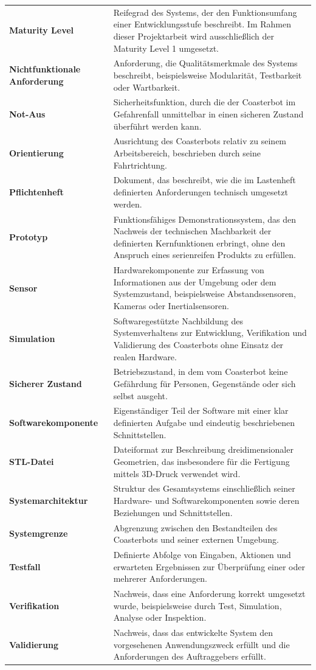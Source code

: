 \documentclass[
  a4paper,
  12pt,
  DIV=12,        %
  parskip=half,  %
  headings=small %
]{scrartcl}
\theoremstyle{definition}
\theoremstyle{definition}
\begin{document}
\begin{longtable}[]{@{}
  >{\raggedright\arraybackslash}p{}
  >{\raggedright\arraybackslash}p{}@{}}
\textbf{Maturity Level} & Reifegrad des Systems, der den Funktionsumfang
einer Entwicklungsstufe beschreibt. Im Rahmen dieser Projektarbeit wird
ausschließlich der Maturity Level 1 umgesetzt. \\
\textbf{Nichtfunktionale Anforderung} & Anforderung, die
Qualitätsmerkmale des Systems beschreibt, beispielsweise Modularität,
Testbarkeit oder Wartbarkeit. \\
\textbf{Not-Aus} & Sicherheitsfunktion, durch die der Coasterbot im
Gefahrenfall unmittelbar in einen sicheren Zustand überführt werden
kann. \\
\textbf{Orientierung} & Ausrichtung des Coasterbots relativ zu seinem
Arbeitsbereich, beschrieben durch seine Fahrtrichtung. \\
\textbf{Pflichtenheft} & Dokument, das beschreibt, wie die im Lastenheft
definierten Anforderungen technisch umgesetzt werden. \\
\textbf{Prototyp} & Funktionsfähiges Demonstrationssystem, das den
Nachweis der technischen Machbarkeit der definierten Kernfunktionen
erbringt, ohne den Anspruch eines serienreifen Produkts zu erfüllen. \\
\textbf{Sensor} & Hardwarekomponente zur Erfassung von Informationen aus
der Umgebung oder dem Systemzustand, beispielsweise Abstandssensoren,
Kameras oder Inertialsensoren. \\
\textbf{Simulation} & Softwaregestützte Nachbildung des Systemverhaltens
zur Entwicklung, Verifikation und Validierung des Coasterbots ohne
Einsatz der realen Hardware. \\
\textbf{Sicherer Zustand} & Betriebszustand, in dem vom Coasterbot keine
Gefährdung für Personen, Gegenstände oder sich selbst ausgeht. \\
\textbf{Softwarekomponente} & Eigenständiger Teil der Software mit einer
klar definierten Aufgabe und eindeutig beschriebenen Schnittstellen. \\
\textbf{STL-Datei} & Dateiformat zur Beschreibung dreidimensionaler
Geometrien, das insbesondere für die Fertigung mittels 3D-Druck
verwendet wird. \\
\textbf{Systemarchitektur} & Struktur des Gesamtsystems einschließlich
seiner Hardware- und Softwarekomponenten sowie deren Beziehungen und
Schnittstellen. \\
\textbf{Systemgrenze} & Abgrenzung zwischen den Bestandteilen des
Coasterbots und seiner externen Umgebung. \\
\textbf{Testfall} & Definierte Abfolge von Eingaben, Aktionen und
erwarteten Ergebnissen zur Überprüfung einer oder mehrerer
Anforderungen. \\
\textbf{Verifikation} & Nachweis, dass eine Anforderung korrekt
umgesetzt wurde, beispielsweise durch Test, Simulation, Analyse oder
Inspektion. \\
\textbf{Validierung} & Nachweis, dass das entwickelte System den
vorgesehenen Anwendungszweck erfüllt und die Anforderungen des
Auftraggebers erfüllt. \\
\end{longtable}
\end{document}

